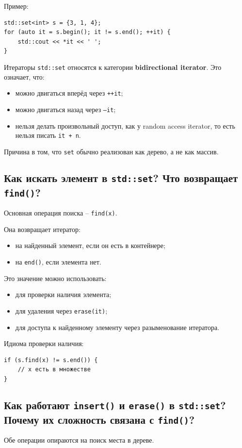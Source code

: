 Пример:
\begin{verbatim}
std::set<int> s = {3, 1, 4};
for (auto it = s.begin(); it != s.end(); ++it) {
    std::cout << *it << ' ';
}
\end{verbatim}

Итераторы \texttt{std::set} относятся к категории \textbf{bidirectional iterator}. Это означает, что:
\begin{itemize}
    \item можно двигаться вперёд через \texttt{++it};
    \item можно двигаться назад через \texttt{--it};
    \item нельзя делать произвольный доступ, как у random access iterator, то есть нельзя писать \texttt{it + n}.
\end{itemize}

Причина в том, что \texttt{set} обычно реализован как дерево, а не как массив.

\subsection{Как искать элемент в \texttt{std::set}? Что возвращает \texttt{find()}?}
Основная операция поиска -- \texttt{find(x)}.

Она возвращает итератор:
\begin{itemize}
    \item на найденный элемент, если он есть в контейнере;
    \item на \texttt{end()}, если элемента нет.
\end{itemize}

Это значение можно использовать:
\begin{itemize}
    \item для проверки наличия элемента;
    \item для удаления через \texttt{erase(it)};
    \item для доступа к найденному элементу через разыменование итератора.
\end{itemize}

Идиома проверки наличия:
\begin{verbatim}
if (s.find(x) != s.end()) {
    // x есть в множестве
}
\end{verbatim}

\subsection{Как работают \texttt{insert()} и \texttt{erase()} в \texttt{std::set}? Почему их сложность связана с \texttt{find()}?}
Обе операции опираются на поиск места в дереве.

